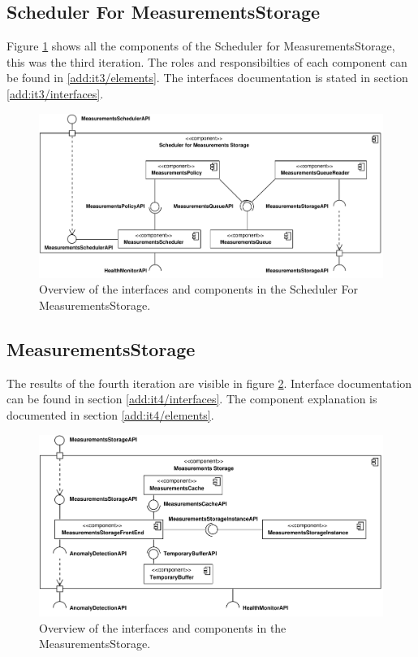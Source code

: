 \subsection{Scheduler For MeasurementsStorage}

\npar Figure \ref{fig:final-architecture/it3} shows all the components of the
Scheduler for MeasurementsStorage, this was the third iteration. The roles and
responsibilties of each component can be found in \ref{add:it3/elements}. The
interfaces documentation is stated in section \ref{add:it3/interfaces}.

\begin{figure}
	\begin{centering}
		\includegraphics[width=\textwidth]{figs/add-it3-interfaces.pdf}
		\caption{Overview of the interfaces and components in the Scheduler For
		MeasurementsStorage.}
		\label{fig:final-architecture/it3}
	\end{centering}
\end{figure}

\subsection{MeasurementsStorage}

\npar The results of the fourth iteration are visible in figure
\ref{fig:final-architecture/it4}. Interface documentation can be found in
section \ref{add:it4/interfaces}. The component explanation is documented in
section \ref{add:it4/elements}.

\begin{figure}
	\begin{centering}
		\includegraphics[width=\textwidth]{figs/add-it4-interfaces.pdf}
		\caption{Overview of the interfaces and components in the
		MeasurementsStorage.}
		\label{fig:final-architecture/it4}
	\end{centering}
\end{figure}

